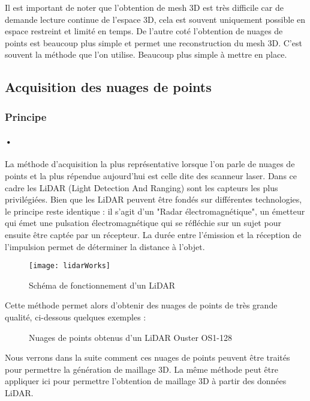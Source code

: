 Il est important de noter que l'obtention de mesh 3D est très difficile car de demande lecture continue de l'espace 3D, cela est souvent uniquement possible en espace restreint et limité en temps. De l'autre coté l'obtention de nuages de points est beaucoup plus simple et permet une reconstruction du mesh 3D. C'est souvent la méthode que l'on utilise. Beaucoup plus simple à mettre en place.
\subsection{Acquisition des nuages de points}
\subsubsection{Principe}
\paragraph{•} La méthode d'acquisition la plus représentative lorsque l'on parle de nuages de points et la plus répendue aujourd'hui est celle dite des scanneur laser. Dans ce cadre les LiDAR (Light Detection And Ranging) sont les capteurs les plus privilégiées. Bien que les LiDAR peuvent être fondés sur différentes technologies, le principe reste identique : il s'agit d'un "Radar électromagnétique", un émetteur qui émet une pulsation électromagnétique qui se réfléchie sur un sujet pour ensuite être captée par un récepteur. La durée entre l'émission et la réception de l'impulsion permet de déterminer la distance à l'objet.

\begin{figure}[h]
    \centering
    \texttt{[image: lidarWorks]}
    \caption{Schéma de fonctionnement d'un LiDAR}
    \label{fig:lidarWork}
\end{figure}
\FloatBarrier
Cette méthode permet alors d'obtenir des nuages de points de très grande qualité, ci-dessous quelques exemples :

\begin{figure}[h]
    \centering
    \qquad
    \caption{Nuages de points obtenus d'un LiDAR Ouster OS1-128}
    \label{fig:PCLidar}
\end{figure}
\FloatBarrier

Nous verrons dans la suite comment ces nuages de points peuvent être traités pour permettre la génération de maillage 3D. La même méthode peut être appliquer ici pour permettre l'obtention de maillage 3D à partir des données LiDAR.

